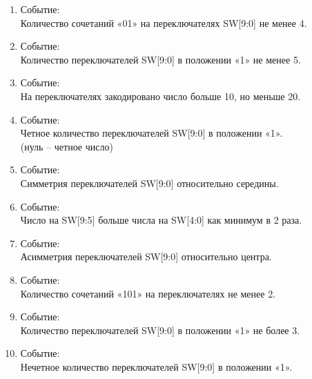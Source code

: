 \begin{enumerate}
  
  \setlength\itemsep{1em}

  \item{
    Событие: \\
      Количество сочетаний «01» на переключателях SW[9:0] не менее 4. 


  }

  \item{
    Событие: \\
      Количество переключателей SW[9:0] в положении «1» не менее 5. 


  }

    \item{
    Событие: \\
      На переключателях закодировано число больше 10, но меньше 20. 


  }

    \item{
    Событие: \\
      Четное количество переключателей SW[9:0] в положении «1». \\(нуль – четное число) 


  }

    \item{
    Событие: \\
      Симметрия переключателей SW[9:0] относительно середины. 


  }

    \item{
    Событие: \\
      Число на SW[9:5] больше числа на SW[4:0] как минимум в 2 раза. 


  }

    \item{
    Событие: \\
      Асимметрия переключателей SW[9:0] относительно центра. 


  }

    \item{
    Событие: \\
      Количество сочетаний «101» на переключателях не менее 2.


  }

    \item{
    Событие: \\
      Количество переключателей SW[9:0] в положении «1» не более 3. 


  }

    \item{
    Событие: \\
      Нечетное количество переключателей SW[9:0] в положении «1». 
      

  }



\end{enumerate}









